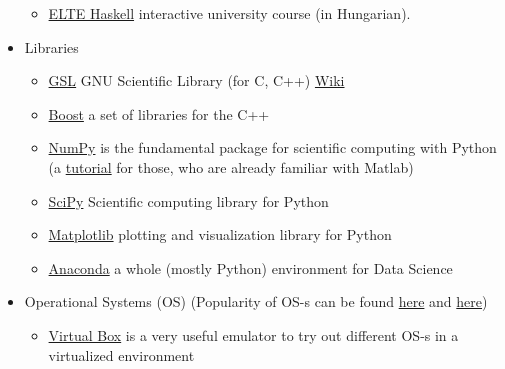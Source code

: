 \documentclass{article}
\begin{document}
\begin{itemize}
\begin{itemize}
        \item \href{http://lambda.inf.elte.hu}{ELTE Haskell} interactive university course (in Hungarian).
    \end{itemize}
    
    \item Libraries
    \begin{itemize}
        \item \href{https://www.gnu.org/software/gsl/}{GSL} GNU Scientific Library (for C, C++) \href{https://en.wikipedia.org/wiki/GNU_Scientific_Library}{Wiki}
        \item \href{https://www.boost.org/}{Boost} a set of libraries for the C++
        \item \href{https://numpy.org/}{NumPy} is the fundamental package for scientific computing with Python (a \href{https://docs.scipy.org/doc/numpy/user/numpy-for-matlab-users.html}{tutorial} for those, who are already familiar with Matlab)
        \item \href{https://www.scipy.org/}{SciPy} Scientific computing library for Python
        \item \href{https://matplotlib.org/}{Matplotlib} plotting and visualization library for Python
        \item \href{https://www.anaconda.com/products/individual}{Anaconda} a whole (mostly Python) environment for Data Science
    \end{itemize}
    
    \item Operational Systems (OS) (Popularity of OS-s can be found \href{https://www.w3schools.com/browsers/browsers_os.asp}{here} and \href{https://gs.statcounter.com/os-market-share}{here})
    \begin{itemize}
        \item \href{https://www.virtualbox.org/}{Virtual Box} is a very useful emulator to try out different OS-s in a virtualized environment
        

\end{itemize}
\end{itemize}
\end{document}

